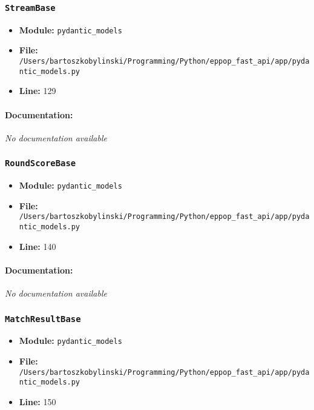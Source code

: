 \documentclass[11pt,a4paper]{article}
\begin{document}
\vspace{1em}
\subsubsection{\texttt{StreamBase}}

\begin{itemize}
    \item \textbf{Module:} \texttt{pydantic\_models}
    \item \textbf{File:} \texttt{/Users/bartoszkobylinski/Programming/Python/eppop\_fast\_api/app/pydantic\_models.py}
    \item \textbf{Line:} 129
\end{itemize}

\paragraph{Documentation:} \textit{No documentation available}


\vspace{1em}
\subsubsection{\texttt{RoundScoreBase}}

\begin{itemize}
    \item \textbf{Module:} \texttt{pydantic\_models}
    \item \textbf{File:} \texttt{/Users/bartoszkobylinski/Programming/Python/eppop\_fast\_api/app/pydantic\_models.py}
    \item \textbf{Line:} 140
\end{itemize}

\paragraph{Documentation:} \textit{No documentation available}


\vspace{1em}
\subsubsection{\texttt{MatchResultBase}}

\begin{itemize}
    \item \textbf{Module:} \texttt{pydantic\_models}
    \item \textbf{File:} \texttt{/Users/bartoszkobylinski/Programming/Python/eppop\_fast\_api/app/pydantic\_models.py}
    \item \textbf{Line:} 150
\end{itemize}
\end{document}
